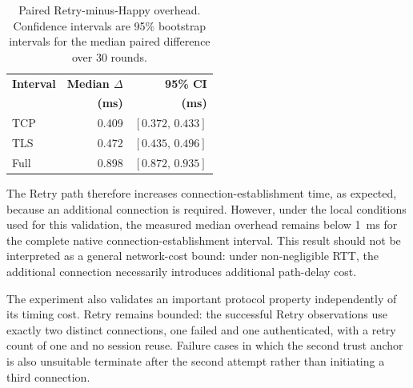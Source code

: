 \documentclass[journal]{IEEEtran}
\begin{document}
\begin{table}[t]

\caption{Paired Retry-minus-Happy overhead. Confidence intervals are 95\% bootstrap intervals for the median paired difference over 30 rounds.}

\label{tab:retry-delta}

\centering

\begin{tabular}{lrr}

\toprule

\textbf{Interval} &

\textbf{Median $\Delta$} &

\textbf{95\% CI} \\

& \textbf{(ms)} & \textbf{(ms)} \\

\midrule

TCP  & 0.409 & $[0.372,\,0.433]$ \\

TLS  & 0.472 & $[0.435,\,0.496]$ \\

Full & 0.898 & $[0.872,\,0.935]$ \\

\bottomrule

\end{tabular}

\end{table}



The Retry path therefore increases connection-establishment time, as
expected, because an additional connection is required. However, under the
local conditions used for this validation, the measured median overhead
remains below 1~ms for the complete native connection-establishment
interval. This result should not be interpreted as a general network-cost
bound: under non-negligible RTT, the additional connection necessarily
introduces additional path-delay cost.



The experiment also validates an important protocol property independently
of its timing cost. Retry remains bounded: the successful Retry observations
use exactly two distinct connections, one failed and one authenticated,
with a retry count of one and no session reuse. Failure cases in which the
second trust anchor is also unsuitable terminate after the second attempt
rather than initiating a third connection.
\end{document}
